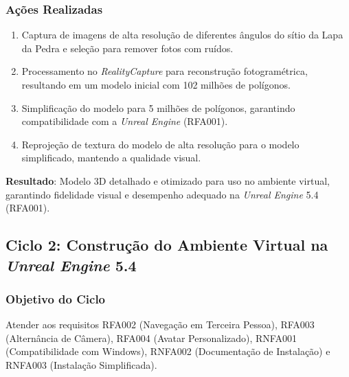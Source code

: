 \subsubsection*{Ações Realizadas}
\begin{enumerate}
    \item Captura de imagens de alta resolução de diferentes ângulos do sítio da Lapa da Pedra e seleção para remover fotos com ruídos.
    \item Processamento no \textit{RealityCapture} para reconstrução fotogramétrica, resultando em um modelo inicial com 102 milhões de polígonos.
    \item Simplificação do modelo para 5 milhões de polígonos, garantindo compatibilidade com a \textit{Unreal Engine} (RFA001).
    \item Reprojeção de textura do modelo de alta resolução para o modelo simplificado, mantendo a qualidade visual.
\end{enumerate}

\textbf{Resultado}: Modelo 3D detalhado e otimizado para uso no ambiente virtual, garantindo fidelidade visual e desempenho adequado na \textit{Unreal Engine} 5.4 (RFA001).

\subsection*{Ciclo 2: Construção do Ambiente Virtual na \textit{Unreal Engine} 5.4} \label{subsec:ciclo2}

\subsubsection*{Objetivo do Ciclo}
Atender aos requisitos RFA002 (Navegação em Terceira Pessoa), RFA003 (Alternância de Câmera), RFA004 (Avatar Personalizado), RNFA001 (Compatibilidade com Windows), RNFA002 (Documentação de Instalação) e RNFA003 (Instalação Simplificada).

